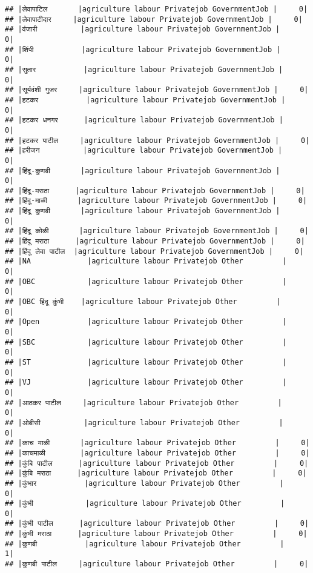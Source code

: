 \documentclass[
]{article}
\begin{document}
\begin{verbatim}
## |लेवापाटिल       |agriculture labour Privatejob GovernmentJob |     0|
## |लेवापाटीदार     |agriculture labour Privatejob GovernmentJob |     0|
## |वंजारी          |agriculture labour Privatejob GovernmentJob |     0|
## |शिंपी           |agriculture labour Privatejob GovernmentJob |     0|
## |सुतार           |agriculture labour Privatejob GovernmentJob |     0|
## |सूर्यवंशी गुजर     |agriculture labour Privatejob GovernmentJob |     0|
## |हटकर           |agriculture labour Privatejob GovernmentJob |     0|
## |हटकर धनगर      |agriculture labour Privatejob GovernmentJob |     0|
## |हटकर पाटील     |agriculture labour Privatejob GovernmentJob |     0|
## |हरीजन          |agriculture labour Privatejob GovernmentJob |     0|
## |हिंदू-कुणबी       |agriculture labour Privatejob GovernmentJob |     0|
## |हिंदू-मराठा      |agriculture labour Privatejob GovernmentJob |     0|
## |हिंदू-माळी       |agriculture labour Privatejob GovernmentJob |     0|
## |हिंदू कुणबी       |agriculture labour Privatejob GovernmentJob |     0|
## |हिंदू कोळी       |agriculture labour Privatejob GovernmentJob |     0|
## |हिंदू मराठा      |agriculture labour Privatejob GovernmentJob |     0|
## |हिंदू लेवा पाटील  |agriculture labour Privatejob GovernmentJob |     0|
## |NA             |agriculture labour Privatejob Other         |     0|
## |OBC            |agriculture labour Privatejob Other         |     0|
## |OBC हिंदू कुंभी    |agriculture labour Privatejob Other         |     0|
## |Open           |agriculture labour Privatejob Other         |     0|
## |SBC            |agriculture labour Privatejob Other         |     0|
## |ST             |agriculture labour Privatejob Other         |     0|
## |VJ             |agriculture labour Privatejob Other         |     0|
## |आठकर पाटील     |agriculture labour Privatejob Other         |     0|
## |ओबीसी          |agriculture labour Privatejob Other         |     0|
## |काच माळी       |agriculture labour Privatejob Other         |     0|
## |काचमाळी        |agriculture labour Privatejob Other         |     0|
## |कुंबि पाटील      |agriculture labour Privatejob Other         |     0|
## |कुंबि मराठा      |agriculture labour Privatejob Other         |     0|
## |कुंभार           |agriculture labour Privatejob Other         |     0|
## |कुंभी            |agriculture labour Privatejob Other         |     0|
## |कुंभी पाटील      |agriculture labour Privatejob Other         |     0|
## |कुंभी मराठा      |agriculture labour Privatejob Other         |     0|
## |कुणबी           |agriculture labour Privatejob Other         |     1|
## |कुणबी पाटील     |agriculture labour Privatejob Other         |     0|

\end{verbatim}
\end{document}
